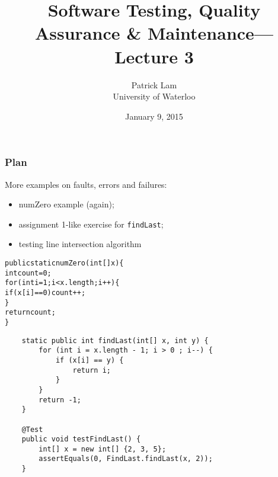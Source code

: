 \documentclass{beamer}
\title{Software Testing, Quality Assurance \& Maintenance---Lecture 3}
\author{Patrick Lam\\University of Waterloo}
\date{January 9, 2015}
\newenvironment{changemargin}[1]{%
  \begin{list}{}{%
    \setlength{\topsep}{0pt}%
    \setlength{\leftmargin}{#1}%
    \setlength{\rightmargin}{1em}
    \setlength{\listparindent}{\parindent}%
    \setlength{\itemindent}{\parindent}%
    \setlength{\parsep}{\parskip}%
  }%
  \item[]}{\end{list}}
\begin{document}
\begin{frame}
  \titlepage
\end{frame}

\begin{frame}
  \frametitle{Plan}

  \begin{changemargin}{2cm}
  More examples on faults, errors and failures:
  \begin{itemize}
  \item numZero example (again);
  \item assignment 1-like exercise for {\tt findLast};
  \item testing line intersection algorithm
  \end{itemize}
  \end{changemargin}
\end{frame}
  
\begin{frame}

  \begin{changemargin}{2em}

\begin{alltt}
public static numZero(int[] x) \{ \\
\quad int count = 0; \\
\quad for (int i = 1; i < x.length; i++) \{ \\
\qquad if (x[i] == 0) count++; \\
\quad \} \\
\quad return count;\\
\}
\end{alltt}
  \end{changemargin}

\end{frame}

\begin{frame}[fragile]

    \begin{lstlisting}
    static public int findLast(int[] x, int y) {
        for (int i = x.length - 1; i > 0 ; i--) {
            if (x[i] == y) {
                return i;
            }
        }
        return -1;
    }

    @Test
    public void testFindLast() {
        int[] x = new int[] {2, 3, 5};
        assertEquals(0, FindLast.findLast(x, 2));
    }
    \end{lstlisting}
  
\end{frame}
\end{document}
